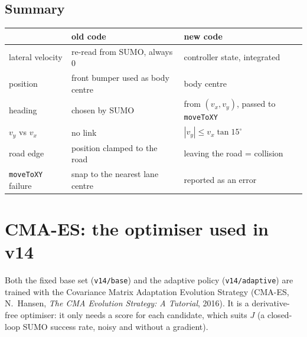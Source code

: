 \documentclass[11pt,a4paper]{article}
\begin{document}
\subsection{Summary}
\begin{center}
\small
\begin{tabular}{p{3.2cm}p{5.4cm}p{5.4cm}}
  \toprule
  & old code & new code \\
  \midrule
  lateral velocity          & re-read from SUMO, always $0$          & controller state, integrated \\
  position                  & front bumper used as body centre       & body centre \\
  heading                   & chosen by SUMO                         & from $(v_x, v_y)$, passed to \texttt{moveToXY} \\
  $v_y$ vs $v_x$            & no link                                & $|v_y| \le v_x \tan 15^\circ$ \\
  road edge                 & position clamped to the road           & leaving the road = collision \\
  \texttt{moveToXY} failure & snap to the nearest lane centre        & reported as an error \\
  \bottomrule
\end{tabular}
\end{center}


\section{CMA-ES: the optimiser used in v14}\label{sec:cmaes}
Both the fixed base set (\texttt{v14/base}) and the adaptive policy (\texttt{v14/adaptive}) are trained with the
Covariance Matrix Adaptation Evolution Strategy (CMA-ES, N.\ Hansen, \emph{The CMA Evolution Strategy: A
Tutorial}, 2016). It is a derivative-free optimiser: it only needs a score for each candidate, which suits $J$
(a closed-loop SUMO success rate, noisy and without a gradient).

\end{document}
